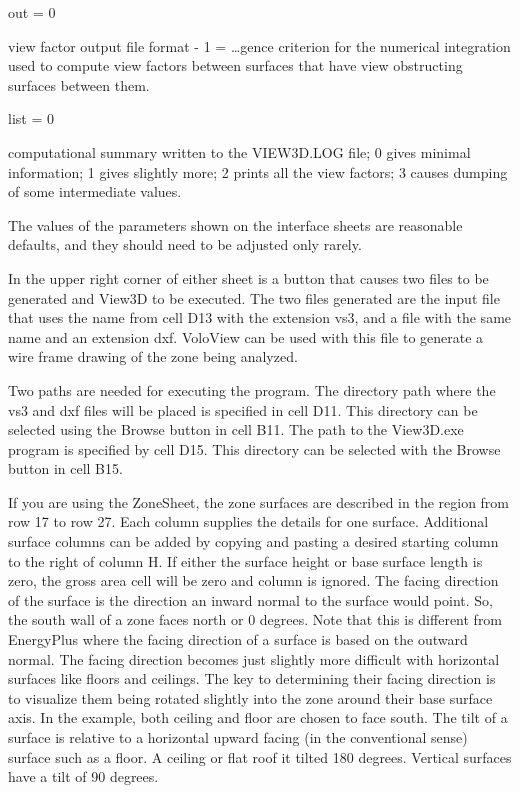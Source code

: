 out = 0

view factor output file format - 1 = \ldots{}gence criterion for the numerical integration used to compute view factors between surfaces that have view obstructing surfaces between them.

list = 0

computational summary written to the VIEW3D.LOG file; 0 gives minimal information; 1 gives slightly more; 2 prints all the view factors; 3 causes dumping of some intermediate values.

The values of the parameters shown on the interface sheets are reasonable defaults, and they should need to be adjusted only rarely.

In the upper right corner of either sheet is a button that causes two files to be generated and View3D to be executed. The two files generated are the input file that uses the name from cell D13 with the extension vs3, and a file with the same name and an extension dxf. VoloView can be used with this file to generate a wire frame drawing of the zone being analyzed.

Two paths are needed for executing the program. The directory path where the vs3 and dxf files will be placed is specified in cell D11. This directory can be selected using the Browse button in cell B11. The path to the View3D.exe program is specified by cell D15. This directory can be selected with the Browse button in cell B15.

If you are using the ZoneSheet, the zone surfaces are described in the region from row 17 to row 27. Each column supplies the details for one surface. Additional surface columns can be added by copying and pasting a desired starting column to the right of column H. If either the surface height or base surface length is zero, the gross area cell will be zero and column is ignored. The facing direction of the surface is the direction an inward normal to the surface would point. So, the south wall of a zone faces north or 0 degrees. Note that this is different from EnergyPlus where the facing direction of a surface is based on the outward normal. The facing direction becomes just slightly more difficult with horizontal surfaces like floors and ceilings. The key to determining their facing direction is to visualize them being rotated slightly into the zone around their base surface axis. In the example, both ceiling and floor are chosen to face south. The tilt of a surface is relative to a horizontal upward facing (in the conventional sense) surface such as a floor. A ceiling or flat roof it tilted 180 degrees. Vertical surfaces have a tilt of 90 degrees.


